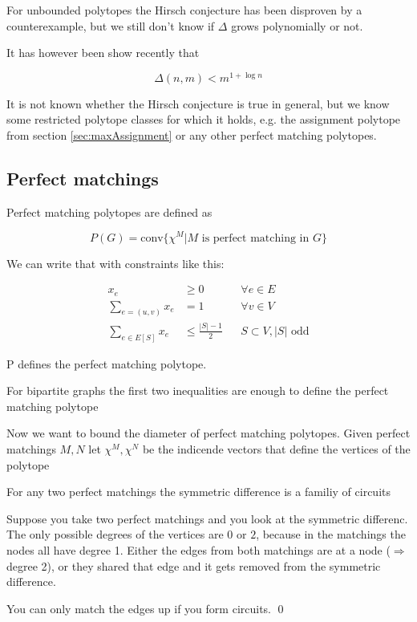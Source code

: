 For unbounded polytopes the Hirsch conjecture has been disproven by a counterexample, but we still don't know if $\Delta$ grows polynomially or not.

It has however been show recently that 

\[\Delta(n,m)<m^{1+\log n}\]

It is not known whether the Hirsch conjecture is true in general, but we know some restricted polytope classes for which it holds, e.g. the assignment polytope from section \ref{sec:maxAssignment} or any other perfect matching polytopes.

\subsection{Perfect matchings}

Perfect matching polytopes are defined as

\[P(G) = \text{conv} \{\chi^M |M \text{ is perfect matching in }G\}\]

We can write that with constraints like this:

\begin{align*}
x_e &\geq 0 &&\forall e\in E\\
\sum_{e=(u,v)} x_e &= 1 &&\forall v\in V\\
\sum_{e\in E[S]} x_e &\leq \frac{|S|-1}{2} &&S\subset V, |S| \text{ odd}
\end{align*}

\begin{thm} P defines the perfect matching polytope.\end{thm}
\begin{thm} For bipartite graphs the first two inequalities are enough to define the perfect matching polytope\end{thm}

Now we want to bound the diameter of perfect matching polytopes. Given perfect matchings $M,N$ let $\chi^M,\chi^N$ be the indicende vectors that define the vertices of the polytope

\begin{lem} For any two perfect matchings the symmetric difference is a familiy of circuits \end{lem}

\begin{pr} Suppose you take two perfect matchings and you look at the symmetric differenc. The only possible degrees of the vertices are $0$ or $2$, because in the matchings the nodes all have degree 1. Either the edges from both matchings are at a node ($\Rightarrow$ degree 2), or they shared that edge and it gets removed from the symmetric difference. 

You can only match the edges up if you form circuits.
\qed \end{pr}

